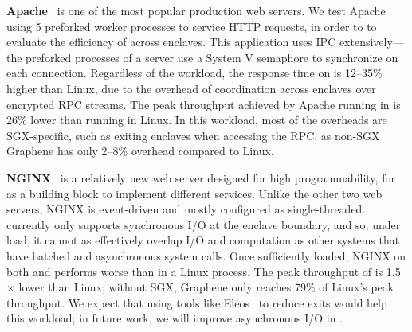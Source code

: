 

{\bf Apache}~\cite{apache} is one of the most popular production web servers. We test Apache using 5 preforked worker processes to service HTTP requests,
in order to 
to evaluate the efficiency of \graphenesgx{} across enclaves.
This application uses IPC extensively---the preforked processes of a server use a System V semaphore to synchronize on each connection.
Regardless of the workload, the response time on \graphenesgx{} is 12--35\% higher than Linux, due to the overhead of coordination across enclaves over encrypted RPC streams.
The peak throughput achieved by Apache running in \graphenesgx{} is 26\% lower than running in Linux.
In this workload, most of the overheads are SGX-specific, such as exiting enclaves when accessing the RPC, as non-SGX Graphene
has only 2--8\% overhead compared to Linux.



{\bf NGINX}~\cite{nginx} is a relatively new web server designed for high programmability, for as a building block to implement different services.
Unlike the other two web servers, NGINX is event-driven and mostly configured as single-threaded.
\graphenesgx{} currently only supports synchronous I/O at the enclave boundary,
and so, under load, it cannot as effectively overlap I/O and computation
as other systems that have batched and asynchronous system calls.
Once sufficiently loaded, NGINX on both \graphene{} and \graphenesgx{} 
performs worse than in a  Linux process. %
The peak throughput of \graphenesgx{} is 1.5$\times$ lower than Linux;
without SGX, Graphene only reaches 79\% of Linux's peak throughput.
We expect that using tools like Eleos~\cite{orenbach17eleos} to reduce exits
would help this workload; in future work, we will improve
asynchronous I/O in \graphenesgx{}.

